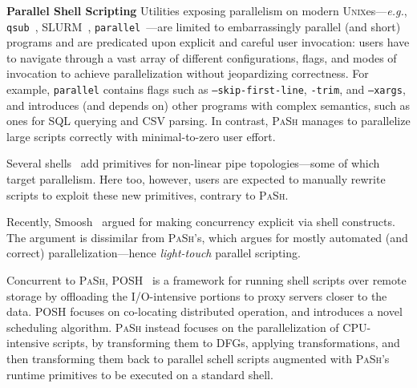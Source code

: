 \documentclass[sigplan, review, screen, anonymous]{acmart}
\newcommand{\eg}{{\em e.g.}, }
\newcommand{\heading}[1]{\vspace{4pt}\noindent\textbf{#1}\enspace}
\newcommand{\ttt}[1]{\texttt{#1}}
\newcommand{\sys}{{\scshape PaSh}\xspace}
\newcommand{\unix}{{\scshape Unix}\xspace}
\begin{document}
\heading{Parallel Shell Scripting}
Utilities exposing parallelism on modern \unix{}es---\eg \ttt{qsub}~\cite{gentzsch2001sun}, \textsc{SLURM}~\cite{yoo2003slurm}, %
  \ttt{parallel}~\cite{Tange2011a}---are limited to embarrassingly parallel (and short) programs and are predicated upon explicit and careful user invocation:
  users have to navigate through a vast array of different configurations, flags, and modes of invocation to achieve parallelization without jeopardizing correctness. %
For example, \ttt{parallel} contains flags such as \ttt{--skip-first-line}, \ttt{-trim}, and \ttt{--xargs},
and introduces (and depends on) other programs with complex semantics, such as ones for SQL querying and CSV parsing.
In contrast, \sys manages to parallelize large scripts correctly with minimal-to-zero user effort.

Several shells~\cite{duff1990rc, mcdonald1988support, dagsh:17} add primitives for non-linear pipe topologies---some of which target parallelism.
Here too, however, users are expected to manually rewrite scripts to exploit these new primitives, contrary to \sys.

Recently, Smoosh~\cite{smoosh:18} argued for making concurrency explicit via shell constructs.
The argument is dissimilar from \sys's, which argues for mostly automated (and correct) parallelization---hence \emph{light-touch} parallel scripting.

Concurrent to \sys, POSH~\cite{raghavan2020posh} is a framework for running shell scripts over remote storage by offloading the I/O-intensive portions to proxy servers closer to the data.
POSH focuses on co-locating distributed operation, and introduces a novel scheduling algorithm. 
\sys instead focuses on the parallelization of CPU-intensive scripts, by transforming them to DFGs, applying transformations, and then transforming them back to parallel schell scripts augmented with \sys's runtime primitives to be executed on a standard shell.
\end{document}
